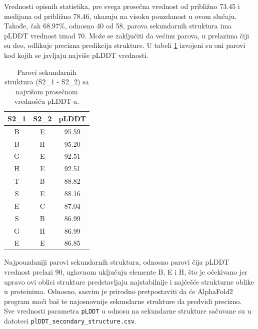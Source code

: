 \documentclass[a4paper,12pt]{article}
\begin{document}
Vrednosti opisnih statistika, pre svega prosečna vrednost od približno 73.45 i medijana od približno 78.46, ukazuju na visoku pouzdanost u ovom slučaju. Takođe, čak $68.97\%$, odnosno 40 od 58, parova sekundarnih struktura ima pLDDT vrednost iznad 70. Može se zaključiti da većinu parova, u prelazima čiji su deo, odlikuje precizna predikcija strukture. U tabeli \ref{Tabela:9} izvojeni su oni parovi kod kojih se javljaju najviše pLDDT vrednosti.
\begin{table}[h!]
\centering
\begin{tabular}{|c|c|c|}
\hline
\textbf{S2\_1} & \textbf{S2\_2} & \textbf{pLDDT} \\
\hline
B & E & 95.59 \\
\hline
B & H & 95.20 \\
\hline
G & E & 92.51 \\
\hline
H & E & 92.51 \\
\hline
T & B & 88.82 \\
\hline
S & E & 88.16 \\
\hline
E & C & 87.04 \\
\hline
S & B & 86.99 \\
\hline
G & H & 86.99 \\
\hline
E & E & 86.85 \\
\hline
\end{tabular}
\caption{Parovi sekundarnih struktura (S2\_1 - S2\_2) sa najvišom prosečnom vrednošću pLDDT-a.}
\label{Tabela:9}
\end{table}
\newpage
Najpouzdaniji parovi sekundarnih struktura, odnosno parovi čija pLDDT vrednost prelazi 90, uglavnom uključuju elemente B, E i H, što je očekivano jer upravo ovi oblici strukture predstavljaju najstabilnije i najčešće strukturne oblike u proteinima. Odnosno, sasvim je prirodno pretpostaviti da će AlphaFold2 program moći baš te najosnovnije sekundarne strukture da predvidi precizno.\\
Sve vrednosti parametra \texttt{pLDDT} u odnosu na sekundarne strukture sačuvane su u datoteci \texttt{plDDT\_secondary\_structure.csv}.
\end{document}
